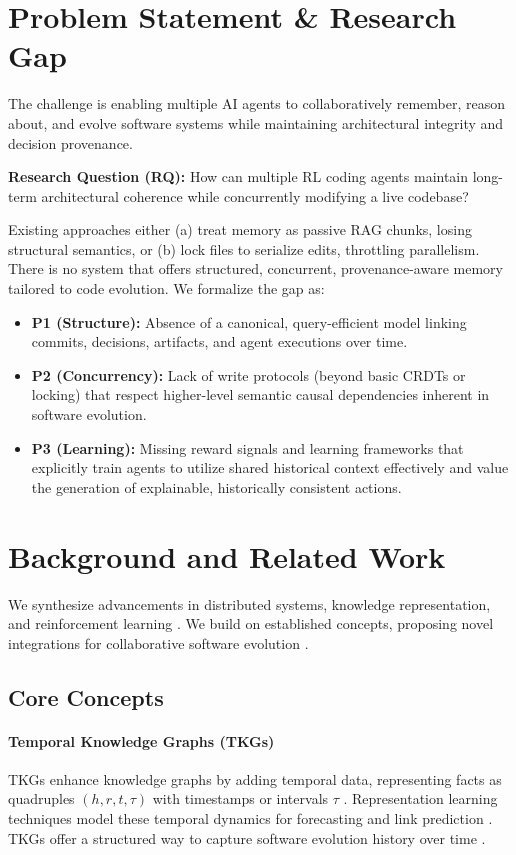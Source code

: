 \documentclass{article}
\begin{document}

\section{Problem Statement \& Research Gap}
The challenge is enabling multiple AI agents to collaboratively remember, reason about, and evolve software systems while maintaining architectural integrity and decision provenance.

\noindent\textbf{Research Question (RQ):} How can multiple RL coding agents maintain long-term architectural coherence while concurrently modifying a live codebase?

Existing approaches either (a) treat memory as passive RAG chunks, losing structural semantics, or (b) lock files to serialize edits, throttling parallelism. There is no system that offers structured, concurrent, provenance-aware memory tailored to code evolution. We formalize the gap as:
\begin{itemize}
  \item \textbf{P1 (Structure):} Absence of a canonical, query-efficient model linking commits, decisions, artifacts, and agent executions over time.
  \item \textbf{P2 (Concurrency):} Lack of write protocols (beyond basic CRDTs or locking) that respect higher-level semantic causal dependencies inherent in software evolution.
  \item \textbf{P3 (Learning):} Missing reward signals and learning frameworks that explicitly train agents to utilize shared historical context effectively and value the generation of explainable, historically consistent actions.
\end{itemize}

\section{Background and Related Work}
We synthesize advancements in distributed systems, knowledge representation, and reinforcement learning \cite{ref34}. We build on established concepts, proposing novel integrations for collaborative software evolution \cite{ref35}.

\subsection{Core Concepts}
\paragraph{Temporal Knowledge Graphs (TKGs)}
TKGs enhance knowledge graphs by adding temporal data, representing facts as quadruples $(h,r,t,\tau)$ with timestamps or intervals $\tau$ \cite{ref23}. Representation learning techniques model these temporal dynamics for forecasting and link prediction \cite{ref3,ref4,ref23,ref38}. TKGs offer a structured way to capture software evolution history over time \cite{ref37}.
\end{document}
